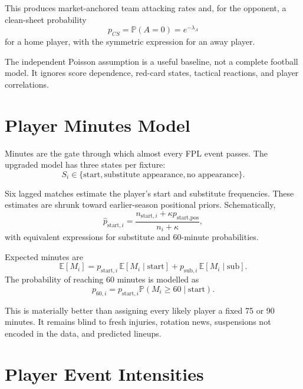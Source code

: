 \documentclass[11pt,a4paper]{article}
\newcommand{\E}{\mathbb{E}}
\newcommand{\Prob}{\mathbb{P}}
\begin{document}
This produces market-anchored team attacking rates and, for the opponent, a clean-sheet probability
\begin{equation}
  p_{CS}=\Prob(A=0)=e^{-\lambda_A}
\end{equation}
for a home player, with the symmetric expression for an away player.

The independent Poisson assumption is a useful baseline, not a complete football model. It ignores score dependence, red-card states, tactical reactions, and player correlations.

\section{Player Minutes Model}

Minutes are the gate through which almost every FPL event passes. The upgraded model has three states per fixture:
\begin{equation}
  S_i\in\{\text{start},\text{substitute appearance},\text{no appearance}\}.
\end{equation}

Six lagged matches estimate the player's start and substitute frequencies. These estimates are shrunk toward earlier-season positional priors. Schematically,
\begin{equation}
  \widehat p_{\text{start},i}=
  \frac{n_{\text{start},i}+\kappa p_{\text{start,pos}}}{n_i+\kappa},
\end{equation}
with equivalent expressions for substitute and 60-minute probabilities.

Expected minutes are
\begin{equation}
  \E[M_i]=p_{\text{start},i}\,\E[M_i\mid\text{start}]
  +p_{\text{sub},i}\,\E[M_i\mid\text{sub}].
\end{equation}
The probability of reaching 60 minutes is modelled as
\begin{equation}
  p_{60,i}=p_{\text{start},i}\Prob(M_i\geq 60\mid\text{start}).
\end{equation}

This is materially better than assigning every likely player a fixed 75 or 90 minutes. It remains blind to fresh injuries, rotation news, suspensions not encoded in the data, and predicted lineups.

\section{Player Event Intensities}
\end{document}

